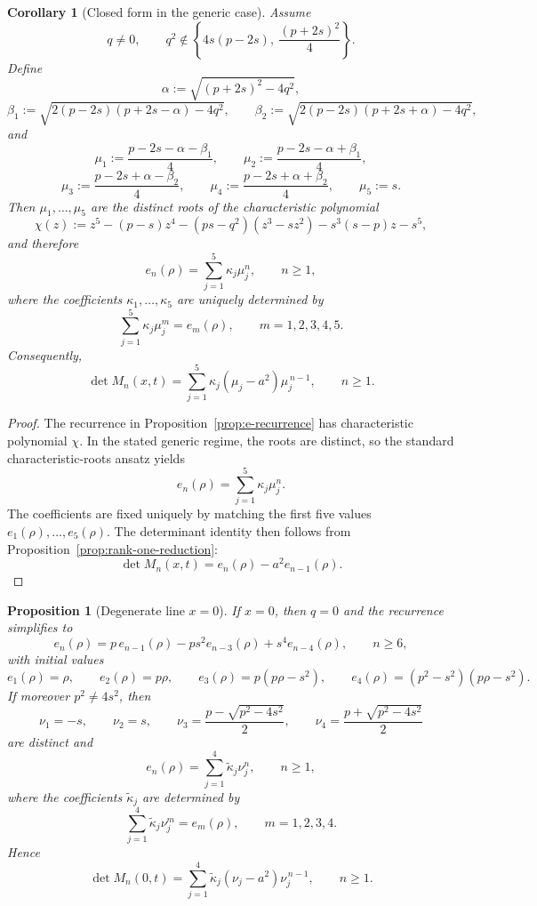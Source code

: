 \documentclass[11pt]{article}
\numberwithin{equation}{section}
\newtheorem{proposition}[theorem]{Proposition}
\newtheorem{corollary}[theorem]{Corollary}
\begin{document}
\begin{corollary}[Closed form in the generic case]\label{cor:generic-closed-form}
Assume
\[
q\neq0,
\qquad
q^2\notin\left\{4s(p-2s),\ \frac{(p+2s)^2}{4}\right\}.
\]
Define
\[
\alpha:=\sqrt{(p+2s)^2-4q^2},
\]
\[
\beta_1:=\sqrt{2(p-2s)(p+2s-\alpha)-4q^2},
\qquad
\beta_2:=\sqrt{2(p-2s)(p+2s+\alpha)-4q^2},
\]
and
\[
\mu_1:=\frac{p-2s-\alpha-\beta_1}{4},\qquad
\mu_2:=\frac{p-2s-\alpha+\beta_1}{4},
\]
\[
\mu_3:=\frac{p-2s+\alpha-\beta_2}{4},\qquad
\mu_4:=\frac{p-2s+\alpha+\beta_2}{4},\qquad
\mu_5:=s.
\]
Then \(\mu_1,\dots,\mu_5\) are the distinct roots of the characteristic polynomial
\[
\chi(z):=
z^5-(p-s)z^4-(ps-q^2)(z^3-sz^2)-s^3(s-p)z-s^5,
\]
and therefore
\[
e_n(\rho)=\sum_{j=1}^5 \kappa_j \mu_j^n,
\qquad n\ge1,
\]
where the coefficients \(\kappa_1,\dots,\kappa_5\) are uniquely determined by
\[
\sum_{j=1}^5 \kappa_j \mu_j^m=e_m(\rho),
\qquad m=1,2,3,4,5.
\]
Consequently,
\[
\det M_n(x,t)
=
\sum_{j=1}^5 \kappa_j(\mu_j-a^2)\mu_j^{\,n-1},
\qquad n\ge1.
\]
\end{corollary}

\begin{proof}
The recurrence in Proposition~\ref{prop:e-recurrence} has characteristic polynomial
\(\chi\).  In the stated generic regime, the roots are distinct, so the standard
characteristic-roots ansatz yields
\[
e_n(\rho)=\sum_{j=1}^5 \kappa_j\mu_j^n.
\]
The coefficients are fixed uniquely by matching the first five values
\(e_1(\rho),\dots,e_5(\rho)\).  The determinant identity then follows from
Proposition~\ref{prop:rank-one-reduction}:
\[
\det M_n(x,t)=e_n(\rho)-a^2e_{n-1}(\rho).
\]
\end{proof}

\begin{proposition}[Degenerate line \(x=0\)]\label{prop:x0-degenerate}
If \(x=0\), then \(q=0\) and the recurrence simplifies to
\[
e_n(\rho)=p\,e_{n-1}(\rho)-p s^2 e_{n-3}(\rho)+s^4 e_{n-4}(\rho),
\qquad n\ge6,
\]
with initial values
\[
e_1(\rho)=\rho,\qquad
e_2(\rho)=p\rho,\qquad
e_3(\rho)=p(p\rho-s^2),\qquad
e_4(\rho)=(p^2-s^2)(p\rho-s^2).
\]
If moreover \(p^2\neq4s^2\), then
\[
\nu_1=-s,\qquad \nu_2=s,\qquad
\nu_3=\frac{p-\sqrt{p^2-4s^2}}{2},\qquad
\nu_4=\frac{p+\sqrt{p^2-4s^2}}{2}
\]
are distinct and
\[
e_n(\rho)=\sum_{j=1}^4 \widetilde\kappa_j \nu_j^n,
\qquad n\ge1,
\]
where the coefficients \(\widetilde\kappa_j\) are determined by
\[
\sum_{j=1}^4 \widetilde\kappa_j \nu_j^m=e_m(\rho),
\qquad m=1,2,3,4.
\]
Hence
\[
\det M_n(0,t)
=
\sum_{j=1}^4 \widetilde\kappa_j(\nu_j-a^2)\nu_j^{\,n-1},
\qquad n\ge1.
\]
\end{proposition}
\end{document}
